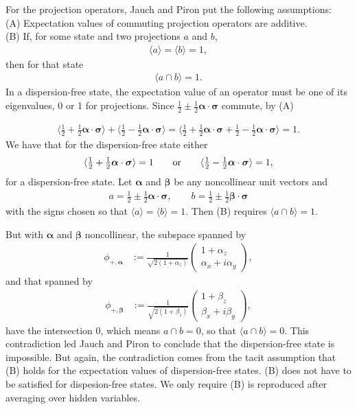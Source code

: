 \documentclass[12pt]{article}
\begin{document}
For the projection operators, Jauch and Piron put the following assumptions:\\
(A) Expectation values of commuting projection operators are additive. \\
(B) If, for some state and two projections $a$ and $b$,
\begin{align*}
\langle a \rangle = \langle b \rangle = 1,
\end{align*}
then for that state 
\begin{align*}
\langle a \cap b \rangle = 1.
\end{align*}
In a dispersion-free state, the expectation value of an operator must be one of its eigenvalues, 0 or 1 for projections. Since $\tfrac{1}{2}\pm\tfrac{1}{2}\bm{\alpha}\cdot\bm{\sigma}$ commute, by (A)

\begin{align*}
\langle\tfrac{1}{2}+\tfrac{1}{2}\bm{\alpha}\cdot\bm{\sigma}\rangle+
\langle\tfrac{1}{2}-\tfrac{1}{2}\bm{\alpha}\cdot\bm{\sigma}\rangle
=\langle\tfrac{1}{2}+\tfrac{1}{2}\bm{\alpha}\cdot\bm{\sigma}+\tfrac{1}{2}-\tfrac{1}{2}\bm{\alpha}\cdot\bm{\sigma}\rangle =1.
\end{align*}
We have that for the dispersion-free state either
\begin{align*}
\langle\tfrac{1}{2}+\tfrac{1}{2}\bm{\alpha}\cdot\bm{\sigma}\rangle = 1 \qquad {\rm or} \qquad \langle\tfrac{1}{2}-\tfrac{1}{2}\bm{\alpha}\cdot\bm{\sigma}\rangle=1,
\end{align*}
for a dispersion-free state. Let $\bm{\alpha}$ and $\bm{\beta}$ be any noncollinear unit vectors and
\begin{align*}
a= \tfrac{1}{2}\pm\tfrac{1}{2}\bm{\alpha}\cdot\bm{\sigma}, \qquad b= \tfrac{1}{2}\pm\tfrac{1}{2}\bm{\beta}\cdot\bm{\sigma}
\end{align*}
with the signs chosen so that $\langle a \rangle = \langle b \rangle = 1$. Then (B) requires $\langle a \cap b \rangle = 1.$

But with $\bm{\alpha}$ and $\bm{\beta}$ noncollinear, the subspace spanned by 
\begin{align*}
    \phi_{+,\bm{\alpha}}
    &:= \frac{1}{\sqrt{2 (1+\alpha_z)}}
    \begin{pmatrix}
      1 +\alpha_z \\
      \alpha_x+i\alpha_y
    \end{pmatrix},
\end{align*}
and that spanned by 
\begin{align*}
    \phi_{+,\bm{\beta}}
    &:= \frac{1}{\sqrt{2 (1+\beta_z)}}
    \begin{pmatrix}
      1 +\beta_z \\
      \beta_x+i\beta_y
    \end{pmatrix},
\end{align*}
have the intersection $0$, which means $a \cap b = 0$, so that $\langle a \cap b \rangle = 0$. This contradiction led Jauch and Piron to conclude that the dispersion-free state is impossible. But again, the contradiction comes from the tacit assumption that (B) holds for the expectation values of dispersion-free states. (B) does not have to be satisfied for dispesion-free states. We only require (B) is reproduced after averaging over hidden variables.



\end{document}
